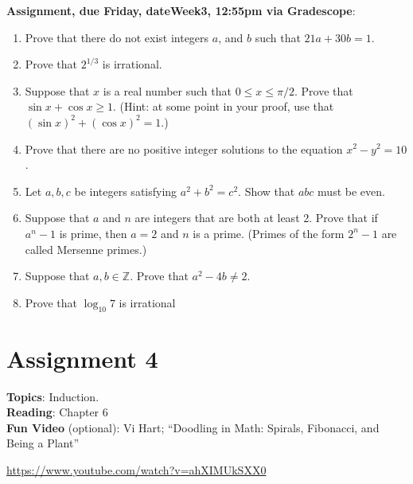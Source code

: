 \documentclass[12pt]{article}
\newcommand{\HWdueTime}{12:55pm }
\begin{document}
\noindent \textbf{Assignment, due Friday, \csname dateWeek3\endcsname, \HWdueTime via Gradescope}:
\begin{enumerate}
\item Prove that there do not exist integers $a$, and $b$ such that $21a + 30b = 1$.
\item Prove that $2^{1/3}$ is irrational.
\item Suppose that $x$ is a real number such that $0 \leq x \leq \pi/2$. Prove that $\sin x + \cos x \geq 1$. (Hint: at some point in your proof, use that $(\sin x)^2 + (\cos x)^2 = 1$.)
\item Prove that there are no positive integer solutions to the equation $x^2 - y^2 = 10$.
\item Let $a, b, c$ be integers satisfying $a^2 + b^2 = c^2$. Show that $abc$ must be even. %
\item Suppose that $a$ and $n$ are integers that are both at least 2. Prove that if $a^n -1$ is prime, then $a = 2$ and $n$ is a prime. (Primes of the form $2^n - 1$ are called Mersenne primes.)
\item Suppose that $a,b \in \mathbb{Z}$. Prove that $a^2 - 4b \neq 2$.

\item Prove that $\log_{10} 7$ is irrational
\end{enumerate}


\newpage
\section[4 (due \csname dateWeek4\endcsname): Induction.]{Assignment 4}

\textbf{Topics}: Induction.
\\

\noindent \textbf{Reading}: Chapter 6
\\

\noindent \textbf{Fun Video} (optional): Vi Hart; ``Doodling in Math: Spirals, Fibonacci, and Being a Plant''

\noindent \url{https://www.youtube.com/watch?v=ahXIMUkSXX0}
\\ 
\end{document}
